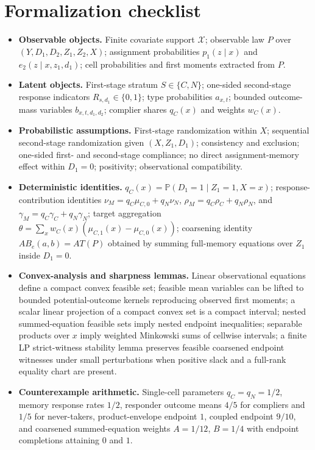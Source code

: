 \documentclass[11pt]{article}
\renewcommand{\Pr}{\mathbb{P}}
\theoremstyle{definition}
\theoremstyle{plain}
\theoremstyle{remark}
\begin{document}
\section{Formalization checklist}
\begin{itemize}[leftmargin=*]
\item \textbf{Observable objects.}  Finite covariate support \(\mathcal X\); observable law \(P\) over \((Y,D_1,D_2,Z_1,Z_2,X)\); assignment probabilities \(p_1(z\mid x)\) and \(e_2(z\mid x,z_1,d_1)\); cell probabilities and first moments extracted from \(P\).

\item \textbf{Latent objects.}  First-stage stratum \(S\in\{C,N\}\); one-sided second-stage response indicators \(R_{s,d_1}\in\{0,1\}\); type probabilities \(a_{x,t}\); bounded outcome-mass variables \(b_{x,t,d_1,d_2}\); complier shares \(q_C(x)\) and weights \(w_C(x)\).

\item \textbf{Probabilistic assumptions.}  First-stage randomization within \(X\); sequential second-stage randomization given \((X,Z_1,D_1)\); consistency and exclusion; one-sided first- and second-stage compliance; no direct assignment-memory effect within \(D_1=0\); positivity; observational compatibility.

\item \textbf{Deterministic identities.}  \(q_C(x)=\Pr(D_1=1\mid Z_1=1,X=x)\); response-contribution identities \(\nu_M=q_C\mu_{C,0}+q_N\nu_N\), \(\rho_M=q_C\rho_C+q_N\rho_N\), and \(\gamma_M=q_C\gamma_C+q_N\gamma_N\); target aggregation \(\theta=\sum_x w_C(x)(\mu_{C,1}(x)-\mu_{C,0}(x))\); coarsening identity \(A B_e(a,b)=A T(P)\) obtained by summing full-memory equations over \(Z_1\) inside \(D_1=0\).

\item \textbf{Convex-analysis and sharpness lemmas.}  Linear observational equations define a compact convex feasible set; feasible mean variables can be lifted to bounded potential-outcome kernels reproducing observed first moments; a scalar linear projection of a compact convex set is a compact interval; nested summed-equation feasible sets imply nested endpoint inequalities; separable products over \(x\) imply weighted Minkowski sums of cellwise intervals; a finite LP strict-witness stability lemma preserves feasible coarsened endpoint witnesses under small perturbations when positive slack and a full-rank equality chart are present.

\item \textbf{Counterexample arithmetic.}  Single-cell parameters \(q_C=q_N=1/2\), memory response rates \(1/2\), responder outcome means \(4/5\) for compliers and \(1/5\) for never-takers, product-envelope endpoint \(1\), coupled endpoint \(9/10\), and coarsened summed-equation weights \(A=1/12\), \(B=1/4\) with endpoint completions attaining \(0\) and \(1\).
\end{itemize}
\end{document}
